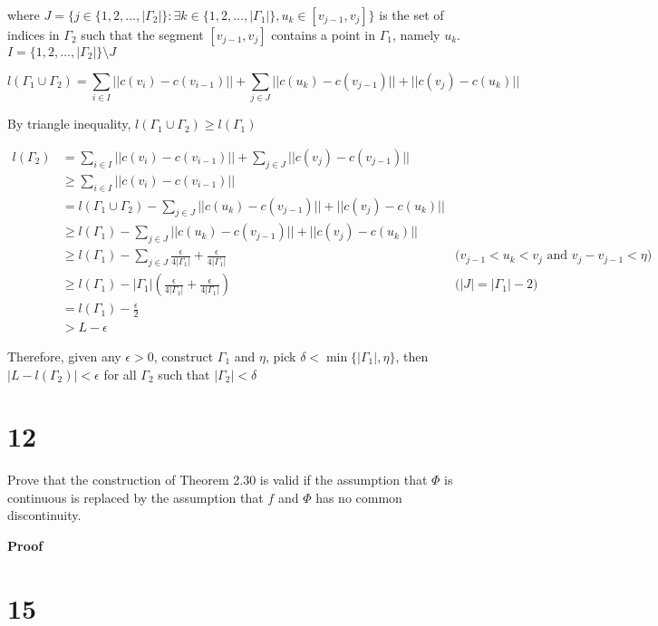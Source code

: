 \documentclass{article}
\begin{document}
where $J = \{j \in \{1, 2, ..., |\Gamma_2| \}: \exists k \in \{1, 2, ..., |\Gamma_1| \}, u_k \in [v_{j-1}, v_j]\}$ is the set of indices in $\Gamma_2$ such that the segment $[v_{j-1}, v_j]$ contains a point in $\Gamma_1$, namely $u_k$. $I = \{1, 2, ..., |\Gamma_2|\} \setminus J$

$$
    l(\Gamma_1 \cup \Gamma_2) = \sum_{i \in I} ||c(v_i) - c(v_{i-1})|| + \sum_{j \in J} ||c(u_k) - c(v_{j-1})|| + ||c(v_j) - c(u_k)||
$$

By triangle inequality, $l(\Gamma_1 \cup \Gamma_2) \geq l(\Gamma_1)$

\begin{align*}
    l(\Gamma_2)
        &= \sum_{i \in I} ||c(v_i) - c(v_{i-1})|| + \sum_{j \in J} ||c(v_j) - c(v_{j-1})|| \\
        &\geq \sum_{i \in I} ||c(v_i) - c(v_{i-1})|| \\
        &= l(\Gamma_1 \cup \Gamma_2) - \sum_{j \in J} ||c(u_k) - c(v_{j-1})|| + ||c(v_j) - c(u_k)|| \\
        &\geq l(\Gamma_1) - \sum_{j \in J} ||c(u_k) - c(v_{j-1})|| + ||c(v_j) - c(u_k)|| \\
        &\geq l(\Gamma_1) - \sum_{j \in J} \frac{\epsilon}{4 |\Gamma_1|} + \frac{\epsilon}{4 |\Gamma_1|} &\text{($v_{j-1} < u_k < v_j$ and $v_j - v_{j-1} < \eta$)}\\
        &\geq l(\Gamma_1) - |\Gamma_1| \left( \frac{\epsilon}{4 |\Gamma_1|} + \frac{\epsilon}{4 |\Gamma_1|} \right) &\text{($|J| = |\Gamma_1| - 2$)}\\
        &= l(\Gamma_1) - \frac{\epsilon}{2} \\
        &> L - \epsilon
\end{align*}

Therefore, given any $\epsilon > 0$, construct $\Gamma_1$ and $\eta$, pick $\delta < \min \{|\Gamma_1|, \eta\}$, then $|L - l(\Gamma_2)| < \epsilon$ for all $\Gamma_2$ such that $|\Gamma_2| < \delta$


\section*{12}

Prove that the construction of Theorem 2.30 is valid if the assumption that $\Phi$ is continuous is replaced by the assumption that $f$ and $\Phi$ has no common discontinuity.

\textbf{Proof}


\section*{15}
\end{document}
